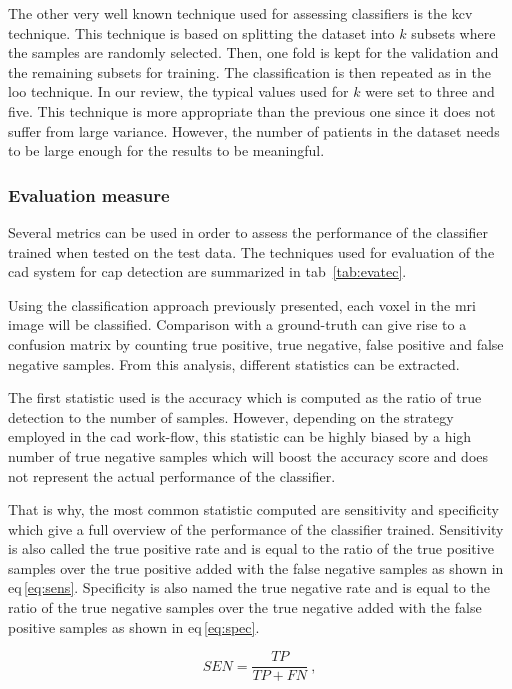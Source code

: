 The other very well known technique used for assessing classifiers is the \acf{kcv} technique. This technique is based on splitting the dataset into $k$ subsets where the samples are randomly selected. Then, one fold is kept for the validation and the remaining subsets for training. The classification is then repeated as in the \ac{loo} technique. In our review, the typical values used for $k$ were set to three and five. This technique is more appropriate than the previous one since it does not suffer from large variance. However, the number of patients in the dataset needs to be large enough for the results to be meaningful.

\subsubsection{Evaluation measure}\label{subsubsec:eval}

Several metrics can be used in order to assess the performance of the classifier trained when tested on the test data. The techniques used for evaluation of the \ac{cad} system for \ac{cap} detection are summarized in \ac{tab}~\ref{tab:evatec}.

Using the classification approach previously presented, each voxel in the \ac{mri} image will be classified. Comparison with a ground-truth can give rise to a confusion matrix by counting true positive, true negative, false positive and false negative samples. From this analysis, different statistics can be extracted. 

The first statistic used is the accuracy which is computed as the ratio of true detection to the number of samples. However, depending on the strategy employed in the \ac{cad} work-flow, this statistic can be highly biased by a high number of true negative samples which will boost the accuracy score and does not represent the actual performance of the classifier.

That is why, the most common statistic computed are sensitivity and specificity which give a full overview of the performance of the classifier trained. Sensitivity is also called the true positive rate and is equal to the ratio of the true positive samples over the true positive added with the false negative samples as shown in \acs{eq}\,\eqref{eq:sens}. Specificity is also named the true negative rate and is equal to the ratio of the true negative samples over the true negative added with the false positive samples as shown in \acs{eq}\,\eqref{eq:spec}.

\begin{equation}
  SEN = \frac{TP}{TP+FN} \ ,
  \label{eq:sens}
\end{equation}

